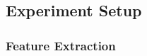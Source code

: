 \documentclass[a4paper, oneside]{csthesis}
\begin{document}




\subsection{Experiment Setup}

\subsubsection{Feature Extraction}
\end{document}

